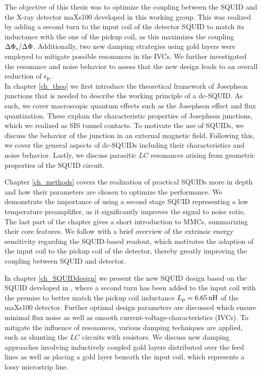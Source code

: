 The objective of this thesis was to optimize the coupling between the SQUID and the X-ray detector maXs100 developed in this working group. This was realized by adding a second turn to the input coil of the detector SQUID to match its inductance with the one of the pickup coil, as this maximizes the coupling  $\Delta\Phi_{\rm s}/\Delta\Phi$. Additionally, two new damping strategies using gold layers were employed to mitigate possible resonances in the IVCs. We further investigated the resonance and noise behavior to assess that the new design leads to an overall reduction of $\epsilon_{\rm p}$. \\

In chapter \ref{ch_theo} we first introduce the theoretical framework of Josephson junctions that is needed to describe the working principle of a dc-SQUID. As such, we cover macroscopic quantum effects such as the Josephson effect and flux quantization. These explain the characteristic properties of Josephson junctions, which we realized as SIS tunnel contacts. To motivate the use of SQUIDs, we discuss the behavior of the junction in an external magnetic field. Following this, we cover the general aspects of dc-SQUIDs including their characteristics and noise behavior. Lastly, we discuss parasitic $LC$ resonances arising from geometric properties of the SQUID circuit.

Chapter \ref{ch_methods} covers the realization of practical SQUIDs more in depth and how their parameters are chosen to optimize the performance. We demonstrate the importance of using a second stage SQUID representing a low temperature preamplifier, as it significantly improves the signal to noise ratio. The last part of the chapter gives a short introduction to MMCs, summarizing their core features. We follow with a brief overview of the extrinsic energy sensitivity regarding the SQUID-based readout, which motivates the adaption of the input coil to the pickup coil of the detector, thereby greatly improving the coupling between SQUID and detector.   

In chapter \ref{ch_SQUIDdesign} we present the new SQUID design based on the SQUID developed in \cite{Bauer2022}, where a second turn has been added to the input coil with the premise to better match the pickup coil inductance $L_{\rm p}=\qty{6.65}{\nH}$ of the maXs100 detector. Further optimal design parameters are discussed which ensure minimal flux noise as well as smooth current-voltage-characteristics (IVCs). To mitigate the influence of resonances, various damping techniques are applied, such as shunting the $LC$ circuits with resistors. We discuss new damping approaches involving inductively coupled gold layers distributed over the feed lines as well as placing a gold layer beneath the input coil, which represents a lossy microstrip line.  


